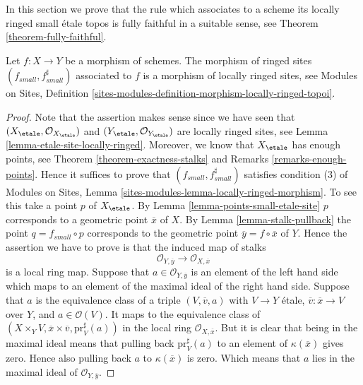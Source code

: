 \noindent
In this section we prove that the rule which associates to a scheme
its locally ringed small \'etale topos is fully faithful in a suitable
sense, see
Theorem \ref{theorem-fully-faithful}.

\begin{lemma}
\label{lemma-morphism-locally-ringed}
Let $f : X \to Y$ be a morphism of schemes.
The morphism of ringed sites $(f_{small}, f_{small}^\sharp)$
associated to $f$ is a morphism of locally ringed sites, see
Modules on Sites,
Definition \ref{sites-modules-definition-morphism-locally-ringed-topoi}.
\end{lemma}

\begin{proof}
Note that the assertion makes sense since we have seen that
$(X_\etale, \mathcal{O}_{X_\etale})$ and
$(Y_\etale, \mathcal{O}_{Y_\etale})$
are locally ringed sites, see
Lemma \ref{lemma-etale-site-locally-ringed}.
Moreover, we know that $X_\etale$ has enough points, see
Theorem \ref{theorem-exactness-stalks}
and
Remarks \ref{remarks-enough-points}.
Hence it suffices to prove that $(f_{small}, f_{small}^\sharp)$
satisfies condition (3) of
Modules on Sites,
Lemma \ref{sites-modules-lemma-locally-ringed-morphism}.
To see this take a point $p$ of $X_\etale$. By
Lemma \ref{lemma-points-small-etale-site}
$p$ corresponds to a geometric point $\overline{x}$ of $X$.
By
Lemma \ref{lemma-stalk-pullback}
the point $q = f_{small} \circ p$ corresponds to the
geometric point $\overline{y} = f \circ \overline{x}$ of $Y$.
Hence the assertion we have to prove is that the induced map
of stalks
$$
\mathcal{O}_{Y, \overline{y}} \longrightarrow \mathcal{O}_{X, \overline{x}}
$$
is a local ring map. Suppose that $a \in \mathcal{O}_{Y, \overline{y}}$
is an element of the left hand side which maps to an element of the maximal
ideal of the right hand side. Suppose that $a$ is the equivalence class
of a triple $(V, \overline{v}, a)$ with $V \to Y$ \'etale,
$\overline{v} : \overline{x} \to V$ over $Y$, and $a \in \mathcal{O}(V)$.
It maps to the equivalence class of
$(X \times_Y V, \overline{x} \times \overline{v}, \text{pr}_V^\sharp(a))$
in the local ring $\mathcal{O}_{X, \overline{x}}$. But it is clear that
being in the maximal ideal means that pulling back $\text{pr}_V^\sharp(a)$
to an element of $\kappa(\overline{x})$ gives zero. Hence also pulling back
$a$ to $\kappa(\overline{x})$ is zero. Which means that $a$ lies in the
maximal ideal of $\mathcal{O}_{Y, \overline{y}}$.
\end{proof}

